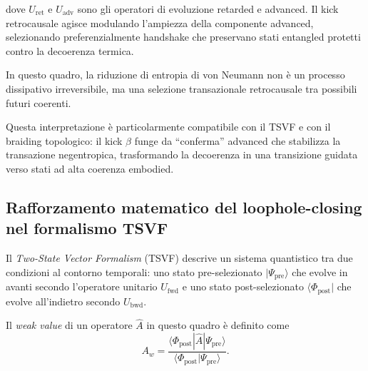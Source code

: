\documentclass[11pt,a4paper]{article}
\theoremstyle{plain}
\theoremstyle{definition}
\begin{document}
\vspace{0.3cm}

dove $U_{\text{ret}}$ e $U_{\text{adv}}$ sono gli operatori di evoluzione retarded e advanced. Il kick retrocausale agisce modulando l'ampiezza della componente advanced, selezionando preferenzialmente handshake che preservano stati entangled protetti contro la decoerenza termica. 


\vspace{0.3cm}


In questo quadro, la riduzione di entropia di von Neumann non è un processo dissipativo irreversibile, ma una selezione transazionale retrocausale tra possibili futuri coerenti.



\vspace{0.4cm}

Questa interpretazione è particolarmente compatibile con il TSVF e con il braiding topologico: il kick $\beta$ funge da “conferma” advanced che stabilizza la transazione negentropica, trasformando la decoerenza in una transizione guidata verso stati ad alta coerenza embodied.






\vspace{0.5cm}




\subsection{Rafforzamento matematico del loophole-closing nel formalismo TSVF}

\vspace{0.2cm}

Il \textit{Two-State Vector Formalism} (TSVF) descrive un sistema quantistico tra due condizioni al contorno temporali: uno stato pre-selezionato \( |\Psi_{\text{pre}}\rangle \) che evolve in avanti secondo l'operatore unitario \( U_{\text{fwd}} \) e uno stato post-selezionato \( \langle \Phi_{\text{post}} | \) che evolve all'indietro secondo \( U_{\text{bwd}} \). 


\vspace{0.3cm}


Il \textit{weak value} di un operatore \( \hat{A} \) in questo quadro è definito come
\[
A_w = \frac{\langle \Phi_{\text{post}} | \hat{A} | \Psi_{\text{pre}} \rangle}{\langle \Phi_{\text{post}} | \Psi_{\text{pre}} \rangle}.
\]

\vspace{0.3cm}
\end{document}
